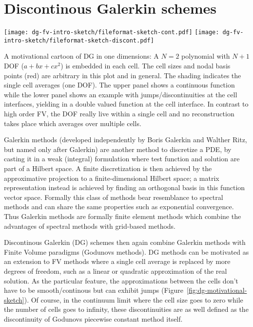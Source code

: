 \section{Discontinous Galerkin schemes}\label{sec:dg}
\begin{marginfigure}[-4cm]
  \texttt{[image: dg-fv-intro-sketch/fileformat-sketch-cont.pdf]}
  \texttt{[image: dg-fv-intro-sketch/fileformat-sketch-discont.pdf]}
  \caption[
    1D DG Motivational example, Matplotlib sketch, 
  ]{A motivational cartoon of DG in one dimensions: A $N=2$ polynomial
    with $N+1$ DOF ($a+bx+cx^2$) is embedded in each cell. The cell sizes and
    nodal basis points (red) are arbitrary in this plot and in general. The
    shading indicates the single cell averages (one DOF). The upper panel shows
    a continuous function while the lower panel shows an example with 
    jumps/discontinuities at the cell interfaces, yielding in a double valued
    function at the cell interface. In contrast to high order FV, the DOF
    really live within a single cell and no reconstruction takes place which
    averages over multiple cells.}
  \label{fig:dg-motivational-sketch}
\end{marginfigure}

Galerkin methods (developed independently by Boris Galerkin and Walther Ritz,
but named only after Galerkin)
are another method to discretize a PDE, by casting it in a weak (integral)
formulation
where test function and solution are part of a Hilbert space. A finite
discretization is then achieved by the approximative projection to a
finite-dimensional Hilbert space; a matrix representation instead is achieved
by finding an orthogonal basis in this function vector space. Formally this
class of methods bear resemblance to spectral methods and can share the same
properties such as exponential convergence. Thus Galerkin methods are formally
finite element methods which combine the advantages of spectral methods with
grid-based methods.

Discontinous Galerkin (DG) schemes then again combine Galerkin methods with
Finite Volume paradigms (Godunovs methods). DG methods can be motivated as
an extension to FV methods where a single cell average is replaced by more
degrees of freedom, such as a linear or quadratic approximation of the real
solution. As the particular feature, the approximations between the cells
don't have to be smooth/continous but can exhibit jumps
(Figure~\ref{fig:dg-motivational-sketch}). Of course, in the continuum limit
where the cell size goes to zero while the number of cells goes to infinity,
these discontinuities are as well defined as the discontinuity of Godunovs
piecewise constant method itself.

